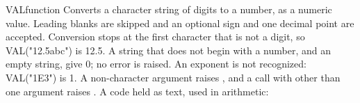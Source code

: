 \begin{XbaseEntry}{VAL}{function}
Converts a character string of digits to a number, as a numeric value.
\Syntax
{}
\Usage
Leading blanks are skipped and an optional sign and one decimal point are accepted. Conversion stops at the first character that is not a digit, so VAL("12.5abc") is 12.5. A string that does not begin with a number, and an empty string, give 0; no error is raised. An exponent is not recognized: VAL("1E3") is 1. A non-character argument raises , and a call with other than one argument raises .
\Examples
{}
A code held as text, used in arithmetic:
\end{XbaseEntry}

